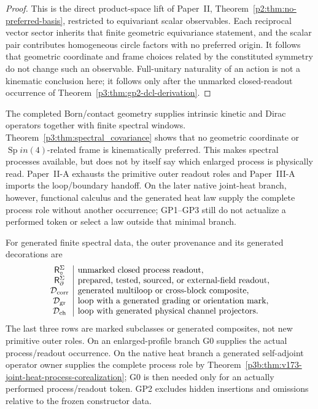 \documentclass[12pt,a4paper]{article}
\begin{document}
\begin{proof}
This is the direct product-space lift of Paper~II,
Theorem~\ref{p2:thm:no-preferred-basis}, restricted to equivariant scalar
observables.  Each reciprocal vector sector inherits that finite geometric
equivariance statement, and the scalar pair contributes homogeneous circle
factors with no preferred origin.  It follows that geometric coordinate and
frame choices related by the constituted symmetry do not change such an
observable.  Full-unitary naturality of an action is not a kinematic
conclusion here; it follows only after the unmarked closed-readout occurrence
of Theorem~\ref{p3:thm:gp2-dcl-derivation}.
\end{proof}


\begin{remark}
\label{p3:rem:why-action-spectral}
The completed Born/contact geometry supplies intrinsic kinetic and Dirac
operators together with finite spectral windows.
Theorem~\ref{p3:thm:spectral_covariance} shows that no geometric coordinate
or \(\operatorname{Sp}in(4)\)-related frame is kinematically preferred.  This makes
spectral processes available, but does not by itself say which enlarged
process is physically read.  Paper~II-A exhausts the primitive outer readout
roles and Paper~III-A imports the loop/boundary handoff.  On the later native
joint-heat branch, however, functional calculus and the generated heat law
supply the complete process role without another occurrence; GP1--GP3 still do
not actualize a performed token or select a law outside that minimal branch.
\end{remark}

\begin{definition}
\label{p3:def:dynamical-branch-atlas}
For generated finite spectral data, the outer provenance and its generated
decorations are
\[
\begin{array}{c|l}
\mathsf R_{\circ}^{\Sigma}&\text{unmarked closed process readout},\\
\mathsf R_{\partial}^{\Sigma}&\text{prepared, tested, sourced, or external-field readout},\\
\mathcal D_{\rm corr}&\text{generated multiloop or cross-block composite},\\
\mathcal D_{\rm gr}&\text{loop with a generated grading or orientation mark},\\
\mathcal D_{\rm ch}&\text{loop with generated physical channel projectors}.
\end{array}
\]
The last three rows are marked subclasses or generated composites, not new
primitive outer roles.  On an enlarged-profile branch G0 supplies the actual
process/readout occurrence.  On the native heat branch a generated
self-adjoint operator owner supplies the complete process role by
Theorem~\ref{p3b:thm:v173-joint-heat-process-corealization}; G0 is then needed
only for an actually performed process/readout token.  GP2 excludes hidden
insertions and omissions relative to the frozen constructor data.
\end{definition}
\end{document}
